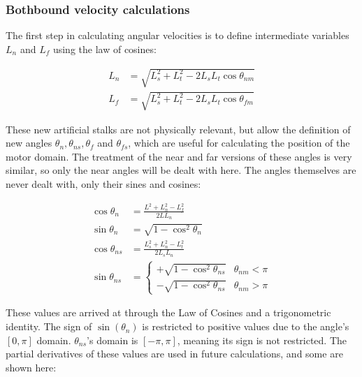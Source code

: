 \documentclass[
11pt, %
english, %
singlespacing, %
headsepline, %
chapterinoneline, %
]{MastersDoctoralThesis} %
\begin{document}
\subsubsection{Bothbound velocity calculations}

The first step in calculating angular velocities is to define intermediate variables $L_n$ and $L_f$ using the law of cosines:

\begin{align}
  L_n &= \sqrt{L_s^2 + L_t^2 - 2L_sL_t\cos{\theta_{nm}}} \\
  L_f &= \sqrt{L_s^2 + L_t^2 - 2L_sL_t\cos{\theta_{fm}}}
\end{align}

These new artificial stalks are not physically relevant, but allow the definition of new angles $\theta_n, \theta_{ns}, \theta_{f}$ and $\theta_{fs}$, which are useful for calculating the position of the motor domain. The treatment of the near and far versions of these angles is very similar, so only the near angles will be dealt with here. The angles themselves are never dealt with, only their sines and cosines:

\begin{align}
  \cos\theta_n &= \frac{L^2 + L_n^2 - L_f^2}{2L L_n} \\
  \sin\theta_{n} &= \sqrt{1 - \cos^2\theta_{n}} \\
  \cos\theta_{ns} &= \frac{L_s^2 + L_n^2 - L_t^2}{2L_s L_n} \\
  \sin\theta_{ns} &=
  \begin{cases}
    +\sqrt{1 - \cos^2\theta_{ns}} & \theta_{nm} < \pi \\
    -\sqrt{1 - \cos^2\theta_{ns}} & \theta_{nm} > \pi
  \end{cases}
\end{align}

These values are arrived at through the Law of Cosines and a trigonometric identity. The sign of $\sin\left(\theta_n\right)$ is restricted to positive values due to the angle's $[0,\pi]$ domain. $\theta_{ns}$'s domain is $[-\pi,\pi]$, meaning its sign is not restricted. The partial derivatives of these values are used in future calculations, and some are shown here:
\end{document}
